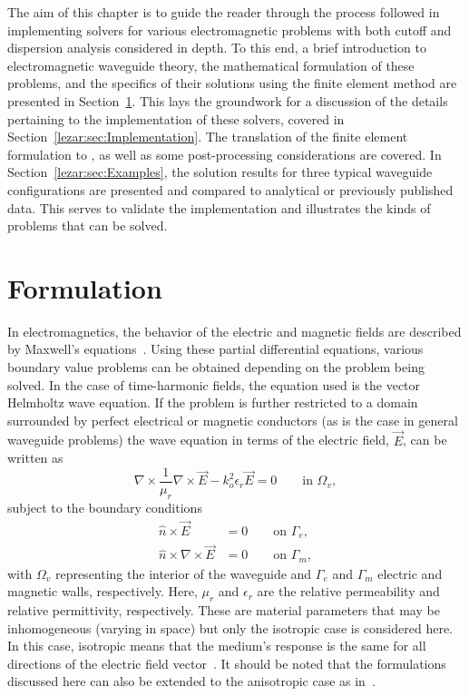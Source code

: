 The aim of this chapter is to guide the reader through the process
followed in implementing solvers for various electromagnetic problems
with both cutoff and dispersion analysis considered in depth. To this
end, a brief introduction to electromagnetic waveguide theory, the
mathematical formulation of these problems, and the specifics of their
solutions using the finite element method are presented in
Section~\ref{lezar:sec:formulation}. This lays the groundwork for a
discussion of the details pertaining to the \fenics{} implementation
of these solvers, covered in
Section~\ref{lezar:sec:Implementation}. The translation of the finite
element formulation to \fenics{}, as well as some post-processing
considerations are covered. In \nobreak Section~\ref{lezar:sec:Examples}, the
solution results for three typical waveguide configurations are
presented and compared to analytical or previously published
data. This serves to validate the implementation and illustrates the
kinds of problems that can be solved.

\section{Formulation}
\label{lezar:sec:formulation}

In electromagnetics, the behavior of the electric and magnetic fields
are described by Maxwell's equations~\citep{Jin2002, Smith1997}.
Using these partial differential equations, various boundary value
problems can be obtained depending on the problem being solved.
In the case of time-harmonic fields, the equation used is the vector
Helmholtz wave equation. If the problem
is further restricted to a domain surrounded by perfect electrical or
magnetic conductors (as is the case in general waveguide problems)
the wave equation in terms of the electric field, $\vec{E}$, can be
written as~\citep{Jin2002}
\begin{equation}
    \label{eq:lezar:vector_helmholtz}
    \nabla\times\frac{1}{\mu_r}\nabla\times\vec{E} - k_o^2\epsilon_r\vec{E} = 0\qquad \text{in
    $\Omega_v$},
\end{equation}
subject to the boundary conditions
\begin{align}
    \label{eq:lezar:electric_wall_BC}
    \hat{n}\times\vec{E} &= 0\qquad \text{on $\Gamma_{e}$},\\
    \label{eq:lezar:magnetic_wall_BC}
    \hat{n}\times\nabla\times{\vec{E}}{} &= 0\qquad \text{on $\Gamma_{m}$},
\end{align}
with $\Omega_v$ representing the interior of the waveguide and
$\Gamma_{e}$ and $\Gamma_{m}$ electric and magnetic walls,
respectively. Here, $\mu_r$ and $\epsilon_r$ are the relative permeability
and relative permittivity, respectively.  These are material parameters
that may be inhomogeneous (varying in space) but only the isotropic
case is considered here. In this case, isotropic means that the
medium's response is the same for all directions of the electric field
vector~\citep{RamoWhinneryVanDuzer1994}. It should be noted that the
formulations discussed here can also be extended to the anisotropic
case as in~\citet{PolycarpouLyonsBalanis1996}.

